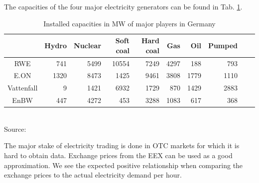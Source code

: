 The capacities of the four major electricity generators can be found in Tab. \ref{tab:majorcapacities}.

\begin{table}[htb]
\centering
\scriptsize
\caption{Installed capacities in MW of major players in Germany}
\vspace{0.3cm}
\begin{tabular}[htb]{crrrrrrrrr}
\hline
           &      Hydro &    Nuclear &  Soft coal &  Hard coal &        Gas &        Oil &     Pumped \\
\hline\hline
       RWE &        741 &       5499 &      10554 &       7249 &       4297 &        188 &        793 \\

      E.ON &       1320 &       8473 &       1425 &       9461 &       3808 &       1779 &       1110 \\

Vattenfall &          9 &       1421 &       6932 &       1729 &        870 &       1429 &       2883 \\

      EnBW &        447 &       4272 &        453 &       3288 &       1083 &        617 &        368 \\
\hline
\end{tabular} 
\label{tab:majorcapacities}
\\
\vspace{0.3cm}
\scriptsize Source: \cite{Ellersdorfer2005}
\end{table}



The major stake of electricity trading is done in OTC markets for which it is hard to obtain data. Exchange prices from the EEX can be used as a good approximation. We see the expected positive relationship when comparing the exchange prices to the actual electricity demand per hour.

